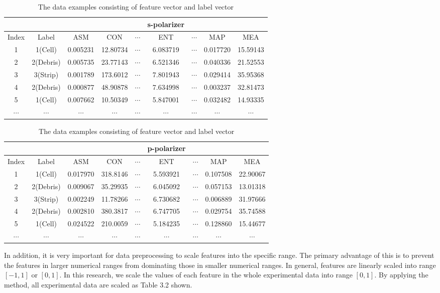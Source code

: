 \begin{table}[!h]
\renewcommand{\arraystretch}{0.5}
\begin{tabular}{||c c | c c c c c c c||}
\hline
& & & & & s-polarizer & & &\\
\hline
Index & Label & ASM & CON & $\cdots$ & ENT & $\cdots$ & MAP & MEA\\[0.7ex]
\hline\hline
1 & 1(Cell) & 0.005231 & 12.80734 & $\cdots$ & 6.083719 & $\cdots$ & 0.017720 & 15.59143 \\
2 & 2(Debris) & 0.005735 & 23.77143 & $\cdots$ & 6.521346 & $\cdots$ & 0.040336 & 21.52553 \\
3 & 3(Strip) & 0.001789 & 173.6012 & $\cdots$ & 7.801943 & $\cdots$ & 0.029414 & 35.95368 \\
4 & 2(Debris) & 0.000877 & 48.90878 & $\cdots$ & 7.634998 & $\cdots$ & 0.003237 & 32.81473 \\
5 & 1(Cell) & 0.007662 & 10.50349 & $\cdots$ & 5.847001 & $\cdots$ & 0.032482 & 14.93335 \\
$\cdots$ & $\cdots$ & $\cdots$ & $\cdots$ & $\cdots$ & $\cdots$ & $\cdots$ & $\cdots$ & $\cdots$\\
\hline
\end{tabular}
\begin{tabular}{||c c | c c c c c c c||}
\hline
& & & & & p-polarizer & & &\\
\hline
Index & Label & ASM & CON & $\cdots$ & ENT & $\cdots$ & MAP & MEA\\[0.7ex]
\hline\hline
1 & 1(Cell) & 0.017970 & 318.8146 & $\cdots$ & 5.593921 & $\cdots$ & 0.107508 & 22.90067 \\
2 & 2(Debris) & 0.009067 & 35.29935 & $\cdots$ & 6.045092 & $\cdots$ & 0.057153 & 13.01318 \\
3 & 3(Strip) & 0.002249 & 11.78266 & $\cdots$ & 6.730682 & $\cdots$ & 0.006889 & 31.97666 \\
4 & 2(Debris) & 0.002810 & 380.3817 & $\cdots$ & 6.747705 & $\cdots$ & 0.029754 & 35.74588 \\
5 & 1(Cell) & 0.024522 & 210.0059 & $\cdots$ & 5.184235 & $\cdots$ & 0.128860 & 15.44677 \\
$\cdots$ & $\cdots$ & $\cdots$ & $\cdots$ & $\cdots$ & $\cdots$ & $\cdots$ & $\cdots$ & $\cdots$\\
\hline
\end{tabular}
\caption {The data examples consisting of feature vector and label vector}
\end{table}
In addition, it is very important for data preprocessing to scale features into the specific range. The primary advantage of this is to prevent the features in larger numerical ranges from dominating those in smaller numerical ranges. In general, features are linearly scaled into range $[-1, 1]$ or $[0, 1]$. In this research, we scale the values of each feature in the whole experimental data into range $[0,1]$. By applying the method, all experimental data are scaled as Table 3.2 shown. 
